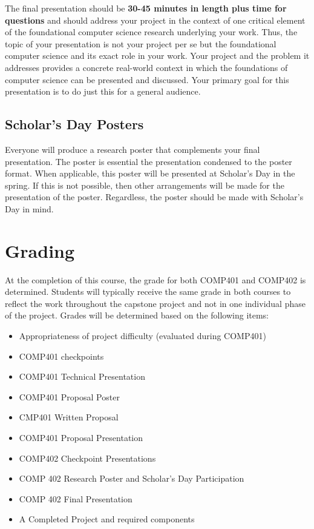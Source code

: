 \documentclass[10pt]{article}
\begin{document}
The final presentation should be \textbf{30-45 minutes in length plus time for questions} and should address your project in the context of one critical element of the foundational computer science research underlying your work. Thus, the topic of your presentation is not your project per se but the foundational computer science and its exact role in your work. Your project and the problem it addresses provides a concrete real-world context in which the foundations of computer science can be presented and discussed.  Your primary goal for this presentation is to do just this for a general audience. 
 

\subsection{Scholar's Day Posters}

Everyone will produce a research poster that complements your final presentation. The poster is essential the presentation condensed to the poster format. When applicable, this poster will be presented at Scholar's Day in the spring. If this is not possible, then other arrangements will be made for the presentation of the poster. Regardless, the poster should be made with Scholar's Day in mind. 

\section{Grading}

At the completion of this course, the grade for both COMP401 and COMP402 is determined. Students will typically receive the same grade in both courses to reflect the work throughout the capstone project and not in one individual phase of the project. Grades will be determined based on the following items:
\begin{itemize}
\item Appropriateness of project difficulty (evaluated during COMP401) 
\item COMP401 checkpoints
\item COMP401 Technical Presentation
\item COMP401 Proposal Poster
\item CMP401 Written Proposal
\item COMP401 Proposal Presentation
\item COMP402 Checkpoint Presentations 
\item COMP 402 Research Poster and Scholar's Day Participation 
\item COMP 402 Final Presentation 
\item A Completed Project and required components
\end{itemize}
\end{document}
